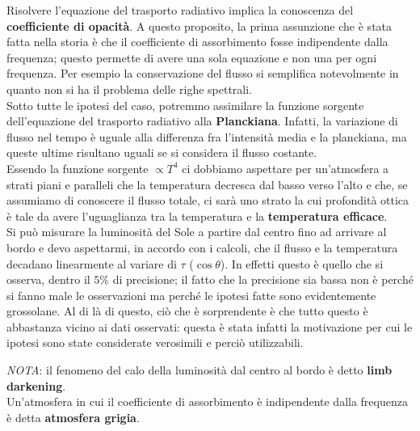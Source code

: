 \documentclass[a4paper,11pt]{article}
\begin{document}
Risolvere l'equazione del trasporto radiativo implica la conoscenza del \textbf{coefficiente di opacità}. A questo proposito, la prima assunzione che è stata fatta nella storia è che il coefficiente di assorbimento fosse indipendente dalla frequenza; questo permette di avere una sola equazione e non una per ogni frequenza. Per esempio la conservazione del flusso si semplifica notevolmente in quanto non si ha il problema delle righe spettrali.\\
Sotto tutte le ipotesi del caso, potremmo assimilare la funzione sorgente dell'equazione del trasporto radiativo alla \textbf{Planckiana}. Infatti, la variazione di flusso nel tempo è uguale alla differenza fra l'intensità media e la planckiana, ma queste ultime risultano uguali se si considera il flusso costante. \\
Essendo la funzione sorgente $\propto T^{4}$ ci dobbiamo aspettare per un'atmosfera a strati piani e paralleli che la temperatura decresca dal basso verso l'alto e che, se assumiamo di conoscere il flusso totale, ci sarà uno strato la cui profondità ottica è tale da avere l'uguaglianza tra la temperatura e la \textbf{temperatura efficace}. \\
Si può misurare la luminosità del Sole a partire dal centro fino ad arrivare al bordo e devo aspettarmi, in accordo con i calcoli, che il flusso e la temperatura decadano linearmente al variare di $\tau$ ($\cos{\theta}$). In effetti questo è quello che si osserva, dentro il $5\%$ di precisione; il fatto che la precisione sia bassa non è perché si fanno male le osservazioni ma perché le ipotesi fatte sono evidentemente grossolane. Al di là di questo, ciò che è sorprendente è che tutto questo è abbastanza vicino ai dati osservati: questa è stata infatti la motivazione per cui le ipotesi sono state considerate verosimili e perciò utilizzabili.

\newpage

\textit{NOTA}: il fenomeno del calo della luminosità dal centro al bordo è detto \textbf{limb darkening}.\\ Un'atmosfera in cui il coefficiente di assorbimento è indipendente dalla frequenza è detta \textbf{atmosfera grigia}.
\end{document}
